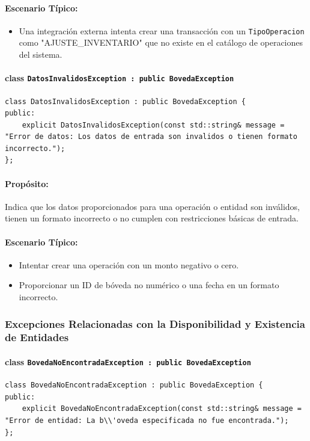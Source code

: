 \documentclass{article}
\newcommand{\inlinecode}[1]{\texttt{#1}}
\begin{document}
\paragraph*{Escenario Típico:}
\begin{itemize}
    \item Una integración externa intenta crear una transacción con un \inlinecode{TipoOperacion} como "AJUSTE\_INVENTARIO" que no existe en el catálogo de operaciones del sistema.
\end{itemize}

\paragraph*{\textbf{class \inlinecode{DatosInvalidosException : public BovedaException}}}
\begin{lstlisting}
class DatosInvalidosException : public BovedaException {
public:
    explicit DatosInvalidosException(const std::string& message = "Error de datos: Los datos de entrada son invalidos o tienen formato incorrecto.");
};
\end{lstlisting}
\paragraph*{Propósito:} Indica que los datos proporcionados para una operación o entidad son inválidos, tienen un formato incorrecto o no cumplen con restricciones básicas de entrada.

\paragraph*{Escenario Típico:}
\begin{itemize}
    \item Intentar crear una operación con un monto negativo o cero.
    \item Proporcionar un ID de bóveda no numérico o una fecha en un formato incorrecto.
\end{itemize}

\subsubsection*{Excepciones Relacionadas con la Disponibilidad y Existencia de Entidades}

\paragraph*{\textbf{class \inlinecode{BovedaNoEncontradaException : public BovedaException}}}
\begin{lstlisting}
class BovedaNoEncontradaException : public BovedaException {
public:
    explicit BovedaNoEncontradaException(const std::string& message = "Error de entidad: La b\\'oveda especificada no fue encontrada.");
};
\end{lstlisting}
\end{document}
